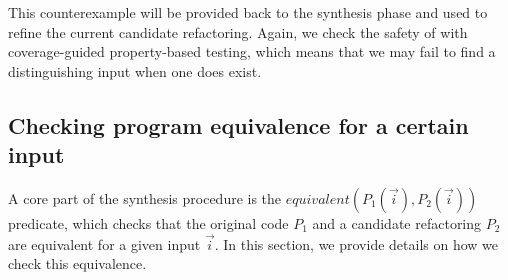 \documentclass[sigconf,review,anonymous]{acmart}
\begin{document}
This counterexample will be provided back to the synthesis phase and
used to refine the current candidate refactoring. Again, we check the
safety of  with coverage-guided property-based testing,
which means that we may fail to find a distinguishing input when one
does exist.










\subsection{Checking program equivalence for a certain input}\label{sec:equiv}

A core part of the synthesis procedure is the $equivalent(P_1(\vec{i}), P_2(\vec{i}))$ predicate,
which checks that the original code $P_1$ and a candidate refactoring $P_2$
are equivalent for a given input $\vec{i}$.
In this section, we provide details on how we check this equivalence.
\end{document}
